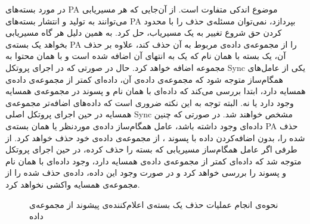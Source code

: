 در مورد بسته‌های PA موضوع اندکی متفاوت است. از آن‌جایی که هر مسیریابی می‌توانند به تولید و انتشار بسته‌های PA بپردازد، نمی‌توان مسئله‌ی حذف را با محدود کردن حق شروع تغییر به یک مسیریاب، حل کرد. به همین دلیل هر گاه مسیریابی بخواهد یک بسته‌ی PA را از مجموعه‌ی داده‌ی مربوط به آن حذف کند، علاوه بر حذف آن، یک بسته با همان نام که یک  به انتهای آن اضافه شده است و با همان محتوا به مجموعه اضافه خواهد کرد. حال در صورتی که در اجرای پروتکل Sync یکی از عامل‌های همگام‌ساز متوجه شود که مجموعه‌ی داده‌ی آن، داده‌ای کمتر از مجموعه‌ی داده‌ی همسایه دارد، ابتدا بررسی می‌کند که داده‌ای با همان نام و پسوند  در مجموعه‌ی همسایه وجود دارد یا نه. البته توجه به این نکته ضروری است که داده‌های اضافه‌تر مجموعه‌ی همسایه در حین اجرای پروتکل اصلی Sync مشخص خواهند شد. در صورتی که چنین داده‌ای وجود داشته باشد، عامل همگام‌ساز داده‌ی موردنظر یا همان بسته‌ی PA حذف شده را، بدون اضافه‌کردن داده با پسوند ، از مجموعه‌ی داده‌ی خود حذف خواهد کرد. از طرفی اگر عامل همگام‌ساز مسیریابی که بسته را حذف کرده، در حین اجرای پروتکل متوجه شد که داده‌ای کمتر از مجموعه‌ی داده‌ی همسایه دارد، وجود داده‌ای با همان نام و پسوند  را بررسی خواهد کرد و در صورت وجود این داده، داده‌ی حذف شده را از مجموعه‌ی همسایه واکشی نخواهد کرد.

\begin{figure}[h!]
\centering
%
\caption{نحوه‌ی انجام عملیات حذف یک بسته‌ی اعلام‌کننده‌ی پیشوند از مجموعه‌ی داده}
\label{fig:Sync2}
\end{figure}


